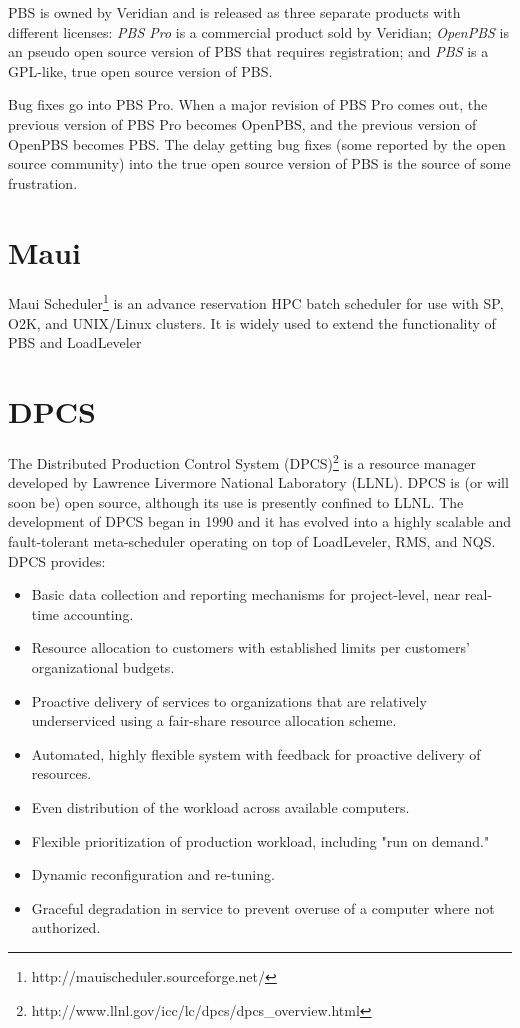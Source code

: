 \documentclass{article}
\begin{document}
PBS is owned by Veridian and is released as three separate products with
different licenses: {\em PBS Pro} is a commercial product sold by Veridian;
{\em OpenPBS} is an pseudo open source version of PBS that requires 
registration; and
{\em PBS} is a GPL-like, true open source version of PBS.

Bug fixes go into PBS Pro.  When a major revision of PBS Pro comes out,
the previous version of PBS Pro becomes OpenPBS, and the previous version
of OpenPBS becomes PBS.  The delay getting bug fixes (some reported by the
open source community) into the true open source version of PBS is the source
of some frustration.

\section{Maui}

Maui Scheduler\footnote{http://mauischeduler.sourceforge.net/}
is an advance reservation HPC batch scheduler for use with SP, 
O2K, and UNIX/Linux clusters. It is widely used to extend the 
functionality of PBS and LoadLeveler

\section{DPCS}

The Distributed Production Control System (DPCS)\footnote{
http://www.llnl.gov/icc/lc/dpcs/dpcs\_overview.html}
is a resource manager developed by Lawrence Livermore National Laboratory (LLNL). 
DPCS is (or will soon be) open source, although its use is presently 
confined to LLNL. The development of DPCS began in 1990 and it has 
evolved into a highly scalable and fault-tolerant meta-scheduler 
operating on top of LoadLeveler, RMS, and NQS. DPCS provides: 
\begin{itemize}
\item Basic data collection and reporting mechanisms for project-level, 
      near real-time accounting.
\item Resource allocation to customers with established limits per 
      customers' organizational budgets. 
\item Proactive delivery of services to organizations that are relatively 
      underserviced using a fair-share resource allocation scheme.
\item Automated, highly flexible system with feedback for proactive delivery 
      of resources.
\item Even distribution of the workload across available computers.
\item Flexible prioritization of production workload, including "run on demand."
\item Dynamic reconfiguration and re-tuning.
\item Graceful degradation in service to prevent overuse of a computer where 
      not authorized.
\end{itemize}
\end{document}
